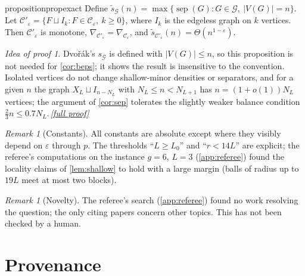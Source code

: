 \documentclass[11pt,a4paper]{article}
\theoremstyle{plain}
\theoremstyle{definition}
\theoremstyle{remark}
\newtheorem{remark}[theorem]{Remark}
\newtheorem*{proofidea}{Idea of proof}
\newcommand{\fullproofref}[1]{\,\hyperref[#1]{\textit{[full proof]}}}
\newcommand{\sep}{\operatorname{sep}}
\newcommand{\cC}{\mathcal C}
\newcommand{\cG}{\mathcal G}
\begin{document}
\begin{restatable}{proposition}{propexact}\label{prop:exact}
Define $\tilde s_{\cG}(n)=\max\{\sep(G):G\in\cG,\ |V(G)|=n\}$. Let $\cC'_\varepsilon=\{F\sqcup I_k: F\in\cC_\varepsilon,\ k\ge0\}$, where $I_k$ is the edgeless graph on $k$ vertices. Then $\cC'_\varepsilon$ is monotone, $\nabla_{\cC'_\varepsilon}=\nabla_{\cC_\varepsilon}$, and $\tilde s_{\cC'_\varepsilon}(n)=\Theta(n^{1-\varepsilon})$.
\end{restatable}
\begin{proofidea}
Dvořák's $s_{\cG}$ is defined with $|V(G)|\le n$, so this proposition is not needed for \cref{cor:beps}; it shows the result is insensitive to the convention. Isolated vertices do not change shallow-minor densities or separators, and for a given $n$ the graph $X_L\sqcup I_{n-N_L}$ with $N_L\le n<N_{L+1}$ has $n=(1+o(1))N_L$ vertices; the argument of \cref{cor:sep} tolerates the slightly weaker balance condition $\frac23n\le0.7N_L$.\fullproofref{pf:exact}
\end{proofidea}

\begin{remark}[Constants]
All constants are absolute except where they visibly depend on $\varepsilon$ through $p$. The thresholds ``$L\ge L_0$'' and ``$r<14L$'' are explicit; the referee's computations on the instance $g=6$, $L=3$ (\cref{app:referee}) found the locality claims of \cref{lem:shallow} to hold with a large margin (balls of radius up to $19L$ meet at most two blocks).
\end{remark}

\begin{remark}[Novelty]
The referee's search (\cref{app:referee}) found no work resolving the question; the only citing papers concern other topics. This has not been checked by a human.
\end{remark}

\section{Provenance}\label{sec:provenance}
\end{document}
